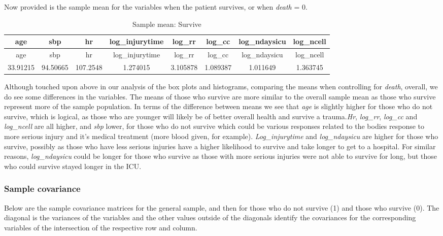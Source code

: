 \documentclass[
]{article}
\begin{document}
Now provided is the sample mean for the variables when the patient
survives, or when \emph{death} = 0.

\begin{longtable}[]{@{}cccccccc@{}}
\caption{Sample mean: Survive}\tabularnewline
\toprule
age & sbp & hr & log\_injurytime & log\_rr & log\_cc & log\_ndaysicu &
log\_ncell\tabularnewline
\midrule
\endfirsthead
\toprule
age & sbp & hr & log\_injurytime & log\_rr & log\_cc & log\_ndaysicu &
log\_ncell\tabularnewline
\midrule
\endhead
33.91215 & 94.50665 & 107.2548 & 1.274015 & 3.105878 & 1.089387 &
1.011649 & 1.363745\tabularnewline
\bottomrule
\end{longtable}

Although touched upon above in our analysis of the box plots and
histograms, comparing the means when controlling for \emph{death},
overall, we do see some differences in the variables. The means of those
who survive are more similar to the overall sample mean as those who
survive represent more of the sample population. In terms of the
difference between means we see that \emph{age} is slightly higher for
those who do not survive, which is logical, as those who are younger
will likely be of better overall health and survive a trauma.\emph{Hr},
\emph{log\_rr}, \emph{log\_cc} and \emph{log\_ncell} are all higher, and
\emph{sbp} lower, for those who do not survive which could be various
responses related to the bodies response to more serious injury and it's
medical treatment (more blood given, for example).
\emph{Log\_injurytime} and \emph{log\_ndaysicu} are higher for those who
survive, possibly as those who have less serious injuries have a higher
likelihood to survive and take longer to get to a hospital. For similar
reasons, \emph{log\_ndaysicu} could be longer for those who survive as
those with more serious injuries were not able to survive for long, but
those who could survive stayed longer in the ICU.

\newpage

\hypertarget{sample-covariance}{%
\subsubsection{Sample covariance}\label{sample-covariance}}

Below are the sample covariance matrices for the general sample, and
then for those who do not survive (1) and those who survive (0). The
diagonal is the variances of the variables and the other values outside
of the diagonals identify the covariances for the corresponding
variables of the intersection of the respective row and column.
\end{document}
